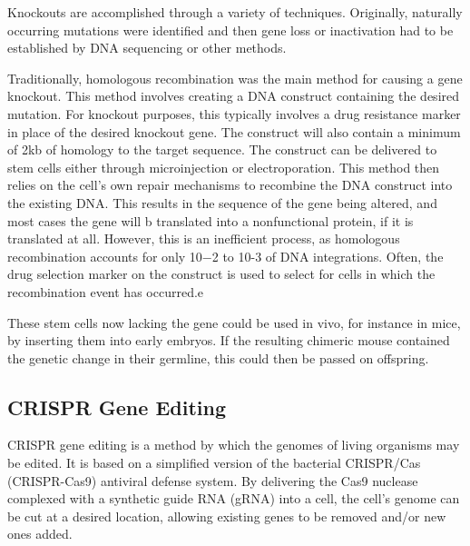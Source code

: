 Knockouts are accomplished through a variety of techniques. Originally, naturally occurring mutations were identified and then gene loss or inactivation had to be established by DNA sequencing or other methods.

Traditionally, homologous recombination was the main method for causing a gene knockout. This method involves creating a DNA construct containing the desired mutation. For knockout purposes, this typically involves a drug resistance marker in place of the desired knockout gene. The construct will also contain a minimum of 2kb of homology to the target sequence. The construct can be delivered to stem cells either through microinjection or electroporation. This method then relies on the cell's own repair mechanisms to recombine the DNA construct into the existing DNA. This results in the sequence of the gene being altered, and most cases the gene will b translated into a nonfunctional protein, if it is translated at all. However, this is an inefficient process, as homologous recombination accounts for only 10−2 to 10-3 of DNA integrations. Often, the drug selection marker on the construct is used to select for cells in which the recombination event has occurred.e

These stem cells now lacking the gene could be used in vivo, for instance in mice, by inserting them into early embryos. If the resulting chimeric mouse contained the genetic change in their germline, this could then be passed on offspring.

\hypertarget{crispr-gene-editing}{%
\subsection{CRISPR Gene Editing}\label{crispr-gene-editing}}

CRISPR gene editing is a method by which the genomes of living organisms may be edited. It is based on a simplified version of the bacterial CRISPR/Cas (CRISPR-Cas9) antiviral defense system. By delivering the Cas9 nuclease complexed with a synthetic guide RNA (gRNA) into a cell, the cell's genome can be cut at a desired location, allowing existing genes to be removed and/or new ones added.




